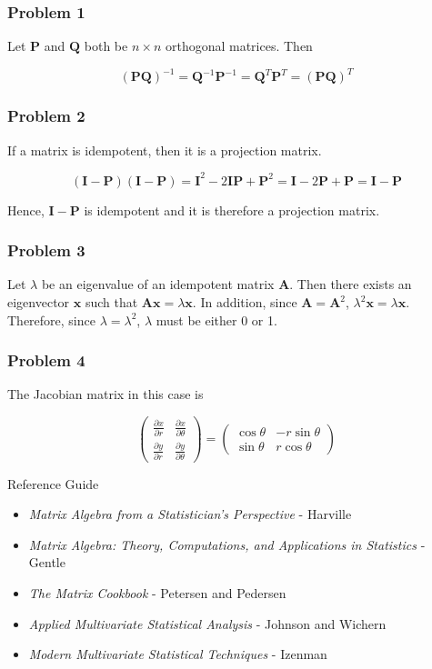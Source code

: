 \documentclass{beamer}
\begin{document}
\begin{frame}
\frametitle{Problem 1}
Let $\mathbf{P}$ and $\mathbf{Q}$ both be $n \times n$ orthogonal matrices.  Then

 $$(\mathbf{PQ})^{-1} = \mathbf{Q}^{-1}\mathbf{P}^{-1} = \mathbf{Q}^T \mathbf{P}^T = (\mathbf{PQ})^T$$
\end{frame}

\begin{frame}
\frametitle{Problem 2}
If a matrix is idempotent, then it is a projection matrix.

$$(\mathbf{I} - \mathbf{P})(\mathbf{I} - \mathbf{P}) = \mathbf{I}^2 - 2\mathbf{IP} + \mathbf{P}^2 = \mathbf{I} - 2\mathbf{P} + \mathbf{P} = \mathbf{I} - \mathbf{P}$$

Hence, $\mathbf{I} - \mathbf{P}$ is idempotent and it is therefore a projection matrix.
\end{frame}

\begin{frame}
\frametitle{Problem 3}
Let $\lambda$ be an eigenvalue of an idempotent matrix $\mathbf{A}$.  Then there exists an eigenvector $\mathbf{x}$ such that $\mathbf{Ax} = \lambda \mathbf{x}$.  In addition, since $\mathbf{A} = \mathbf{A}^2$, $\lambda^2 \mathbf{x} = \lambda \mathbf{x}$.  Therefore, since $\lambda = \lambda^2$, $\lambda$ must be either 0 or 1.
\end{frame}

\begin{frame}
\frametitle{Problem 4}
The Jacobian matrix in this case is

$$\begin{pmatrix} \frac{\partial x}{\partial r} & \frac{\partial x}{\partial \theta} \\ \frac{\partial y}{\partial r} & \frac{\partial y}{\partial \theta}\end{pmatrix} = \begin{pmatrix} \cos \theta & -r \sin \theta \\ \sin \theta & r \cos \theta \end{pmatrix}$$
\end{frame}




\begin{frame}{Reference Guide}
\begin{itemize}
\item{\emph{Matrix Algebra from a Statistician's Perspective} - Harville}
\item{\emph{Matrix Algebra: Theory, Computations, and Applications in Statistics} - Gentle}
\item{\emph{The Matrix Cookbook} - Petersen and Pedersen}
\item{\emph{Applied Multivariate Statistical Analysis} - Johnson and Wichern}
\item{\emph{Modern Multivariate Statistical Techniques} - Izenman}
\end{itemize}
\end{frame}
\end{document}
